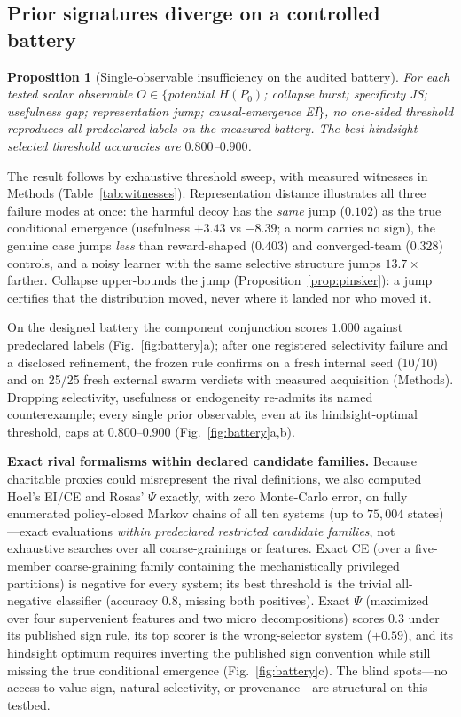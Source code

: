 \documentclass[11pt]{article}
\newtheorem{proposition}{Proposition}
\theoremstyle{definition}
\begin{document}
\subsection*{Prior signatures diverge on a controlled battery}
\label{sec:battery}

\begin{proposition}[Single-observable insufficiency on the audited battery]\label{prop:nosingle}
For each tested scalar observable
$O \in \{$potential $H(P_0)$; collapse burst; specificity JS;
usefulness gap; representation jump; causal-emergence EI$\}$, no
one-sided threshold reproduces all predeclared labels on the measured
battery. The best hindsight-selected threshold accuracies are
$0.800$--$0.900$.
\end{proposition}

The result follows by exhaustive threshold sweep, with measured
witnesses in Methods (Table~\ref{tab:witnesses}). Representation
distance illustrates all three failure modes at once: the harmful
decoy has the \emph{same} jump ($0.102$) as the true conditional
emergence (usefulness $+3.43$ vs $-8.39$; a norm carries no sign), the
genuine case jumps \emph{less} than reward-shaped ($0.403$) and
converged-team ($0.328$) controls, and a noisy learner with the same
selective structure jumps $13.7\times$ farther. Collapse upper-bounds
the jump (Proposition~\ref{prop:pinsker}): a jump certifies that the
distribution moved, never where it landed nor who moved it.

On the designed battery the component conjunction scores $1.000$
against predeclared labels (Fig.~\ref{fig:battery}a); after one
registered selectivity failure and a disclosed refinement, the frozen
rule confirms on a fresh internal seed (10/10) and on 25/25 fresh
external swarm verdicts with measured acquisition (Methods). Dropping
selectivity, usefulness or endogeneity re-admits its named
counterexample; every single prior observable, even at its
hindsight-optimal threshold, caps at $0.800$--$0.900$
(Fig.~\ref{fig:battery}a,b).

\textbf{Exact rival formalisms within declared candidate families.}
Because charitable proxies could misrepresent the rival definitions, we
also computed Hoel's EI/CE and Rosas' $\Psi$ exactly, with zero
Monte-Carlo error, on fully enumerated policy-closed Markov chains of
all ten systems (up to $75{,}004$ states)---exact evaluations
\emph{within predeclared restricted candidate families}, not
exhaustive searches over all coarse-grainings or features. Exact CE
(over a five-member coarse-graining family containing the
mechanistically privileged partitions) is negative for every system;
its best threshold is the trivial all-negative classifier (accuracy
$0.8$, missing both positives). Exact $\Psi$ (maximized over four
supervenient features and two micro decompositions) scores $0.3$ under
its published sign rule, its top scorer is the wrong-selector system
($+0.59$), and its hindsight optimum requires inverting the published
sign convention while still missing the true conditional emergence
(Fig.~\ref{fig:battery}c). The blind spots---no access to value sign,
natural selectivity, or provenance---are structural on this testbed.
\end{document}
